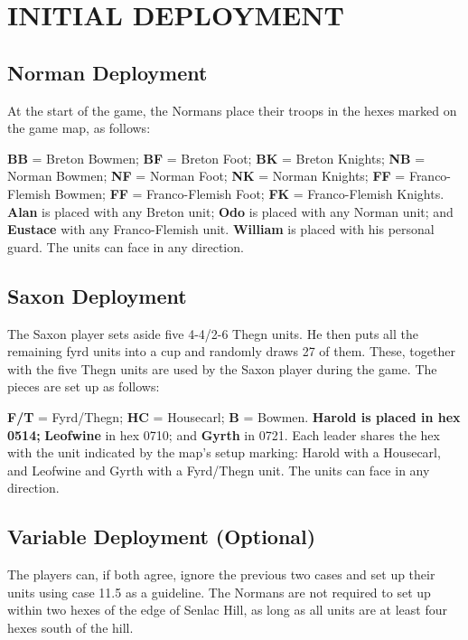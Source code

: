 \section{INITIAL DEPLOYMENT}

\subsection{Norman Deployment}

At the start of the game, the Normans place their troops in the hexes marked on the game map, as follows:

\textbf{BB} = Breton Bowmen; \textbf{BF} = Breton Foot; \textbf{BK} = Breton Knights; \textbf{NB} = Norman Bowmen; \textbf{NF} = Norman Foot; \textbf{NK} = Norman Knights; \textbf{FF} = Franco-Flemish Bowmen; \textbf{FF} = Franco-Flemish Foot; \textbf{FK} = Franco-Flemish Knights. \textbf{Alan} is placed with any Breton unit; \textbf{Odo} is placed with any Norman unit; and \textbf{Eustace} with any Franco-Flemish unit. \textbf{William} is placed with his personal guard. The units can face in any direction.

\subsection{Saxon Deployment}

The Saxon player sets aside five 4-4/2-6 Thegn units. He then puts all the remaining fyrd units into a cup and randomly draws 27 of them. These, together with the five Thegn units are used by the Saxon player during the game. The pieces are set up as follows:

\textbf{F/T} = Fyrd/Thegn; \textbf{HC} = Housecarl; \textbf{B} = Bowmen. \textbf{Harold is placed in hex 0514;} \textbf{Leofwine} in hex 0710; and \textbf{Gyrth} in 0721. Each leader shares the hex with the unit indicated by the map's setup marking: Harold with a Housecarl, and Leofwine and Gyrth with a Fyrd/Thegn unit. The units can face in any direction.

\subsection{Variable Deployment (Optional)}

The players can, if both agree, ignore the previous two cases and set up their units using case 11.5 as a guideline. The Normans are not required to set up within two hexes of the edge of Senlac Hill, as long as all units are at least four hexes south of the hill.

